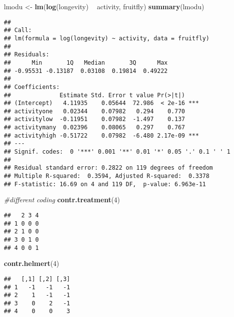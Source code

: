 \documentclass[
]{article}
\newenvironment{Shaded}{\begin{snugshade}}{\end{snugshade}}
\newcommand{\CommentTok}[1]{\textcolor[rgb]{0.56,0.35,0.01}{\textit{#1}}}
\newcommand{\DecValTok}[1]{\textcolor[rgb]{0.00,0.00,0.81}{#1}}
\newcommand{\KeywordTok}[1]{\textcolor[rgb]{0.13,0.29,0.53}{\textbf{#1}}}
\newcommand{\NormalTok}[1]{#1}
\newcommand{\OperatorTok}[1]{\textcolor[rgb]{0.81,0.36,0.00}{\textbf{#1}}}
\newcommand{\StringTok}[1]{\textcolor[rgb]{0.31,0.60,0.02}{#1}}
\begin{document}
\begin{Shaded}
\begin{Highlighting}[]
\NormalTok{lmodu <-}\StringTok{ }\KeywordTok{lm}\NormalTok{(}\KeywordTok{log}\NormalTok{(longevity) }\OperatorTok{~}\StringTok{ }\NormalTok{activity, fruitfly)}
\KeywordTok{summary}\NormalTok{(lmodu)}
\end{Highlighting}
\end{Shaded}

\begin{verbatim}
## 
## Call:
## lm(formula = log(longevity) ~ activity, data = fruitfly)
## 
## Residuals:
##      Min       1Q   Median       3Q      Max 
## -0.95531 -0.13187  0.03108  0.19814  0.49222 
## 
## Coefficients:
##              Estimate Std. Error t value Pr(>|t|)    
## (Intercept)   4.11935    0.05644  72.986  < 2e-16 ***
## activityone   0.02344    0.07982   0.294    0.770    
## activitylow  -0.11951    0.07982  -1.497    0.137    
## activitymany  0.02396    0.08065   0.297    0.767    
## activityhigh -0.51722    0.07982  -6.480 2.17e-09 ***
## ---
## Signif. codes:  0 '***' 0.001 '**' 0.01 '*' 0.05 '.' 0.1 ' ' 1
## 
## Residual standard error: 0.2822 on 119 degrees of freedom
## Multiple R-squared:  0.3594, Adjusted R-squared:  0.3378 
## F-statistic: 16.69 on 4 and 119 DF,  p-value: 6.963e-11
\end{verbatim}

\begin{Shaded}
\begin{Highlighting}[]
\CommentTok{#different coding}
\KeywordTok{contr.treatment}\NormalTok{(}\DecValTok{4}\NormalTok{)}
\end{Highlighting}
\end{Shaded}

\begin{verbatim}
##   2 3 4
## 1 0 0 0
## 2 1 0 0
## 3 0 1 0
## 4 0 0 1
\end{verbatim}

\begin{Shaded}
\begin{Highlighting}[]
\KeywordTok{contr.helmert}\NormalTok{(}\DecValTok{4}\NormalTok{)}
\end{Highlighting}
\end{Shaded}

\begin{verbatim}
##   [,1] [,2] [,3]
## 1   -1   -1   -1
## 2    1   -1   -1
## 3    0    2   -1
## 4    0    0    3
\end{verbatim}
\end{document}
